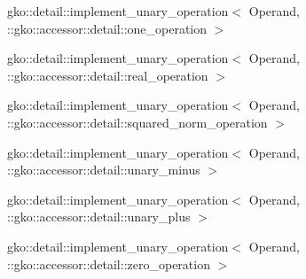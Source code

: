 \begin{DoxyCompactList}
\item gko\+:\+:detail\+:\+:implement\+\_\+unary\+\_\+operation$<$ Operand, \+:\+:gko\+:\+:accessor\+:\+:detail\+:\+:one\+\_\+operation $>$\begin{DoxyCompactList}
\item {}
\end{DoxyCompactList}
\item gko\+:\+:detail\+:\+:implement\+\_\+unary\+\_\+operation$<$ Operand, \+:\+:gko\+:\+:accessor\+:\+:detail\+:\+:real\+\_\+operation $>$\begin{DoxyCompactList}
\item {}
\end{DoxyCompactList}
\item gko\+:\+:detail\+:\+:implement\+\_\+unary\+\_\+operation$<$ Operand, \+:\+:gko\+:\+:accessor\+:\+:detail\+:\+:squared\+\_\+norm\+\_\+operation $>$\begin{DoxyCompactList}
\item {}
\end{DoxyCompactList}
\item gko\+:\+:detail\+:\+:implement\+\_\+unary\+\_\+operation$<$ Operand, \+:\+:gko\+:\+:accessor\+:\+:detail\+:\+:unary\+\_\+minus $>$\begin{DoxyCompactList}
\item {}
\end{DoxyCompactList}
\item gko\+:\+:detail\+:\+:implement\+\_\+unary\+\_\+operation$<$ Operand, \+:\+:gko\+:\+:accessor\+:\+:detail\+:\+:unary\+\_\+plus $>$\begin{DoxyCompactList}
\item {}
\end{DoxyCompactList}
\item gko\+:\+:detail\+:\+:implement\+\_\+unary\+\_\+operation$<$ Operand, \+:\+:gko\+:\+:accessor\+:\+:detail\+:\+:zero\+\_\+operation $>$\begin{DoxyCompactList}

\end{DoxyCompactList}
\end{DoxyCompactList}
